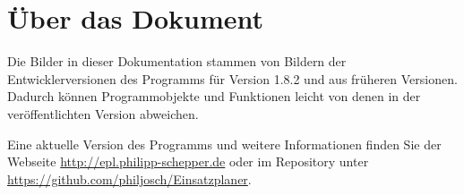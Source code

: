 \section{Über das Dokument}\label{epl:allg:sonstiges}
Die Bilder in dieser Dokumentation stammen von Bildern der Entwicklerversionen des Programms für Version
1.8.2
und aus früheren Versionen.
Dadurch können Programmobjekte und Funktionen leicht von denen in der veröffentlichten Version abweichen.

Eine aktuelle Version des Programms und weitere Informationen finden Sie der Webseite \url{http://epl.philipp-schepper.de}
oder im Repository unter \url{https://github.com/philjosch/Einsatzplaner}.
